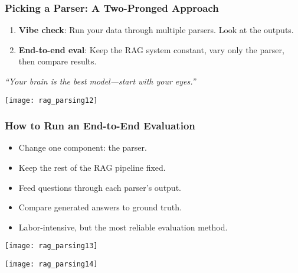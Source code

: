 \begin{frame}[fragile]\frametitle{Picking a Parser: A Two-Pronged Approach}
  \begin{enumerate}
    \item \textbf{Vibe check}: Run your data through multiple parsers. Look at the outputs.
    \item \textbf{End-to-end eval}: Keep the RAG system constant, vary only the parser, then compare results.
  \end{enumerate}
  \vspace{1em}
  \textit{“Your brain is the best model—start with your eyes.”}
  
    \begin{center}
      \texttt{[image: rag\_parsing12]}
    \end{center}    
\end{frame}

\begin{frame}[fragile]\frametitle{How to Run an End-to-End Evaluation}
  \begin{itemize}
    \item Change one component: the parser.
    \item Keep the rest of the RAG pipeline fixed.
    \item Feed questions through each parser’s output.
    \item Compare generated answers to ground truth.
    \item Labor-intensive, but the most reliable evaluation method.
  \end{itemize}
  
    \begin{center}
      \texttt{[image: rag\_parsing13]}
	  
      \texttt{[image: rag\_parsing14]}
	  
    \end{center}   
\end{frame}

